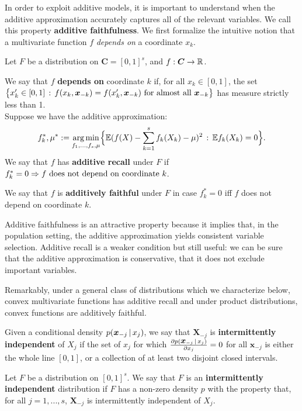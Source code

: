 In order to exploit additive models, it is important to understand when the
additive approximation accurately captures all of the relevant variables.
We call this property \textbf{additive faithfulness}. We first formalize the intuitive notion that a multivariate function $f$ \emph{depends on} a coordinate $x_k$.

\begin{definition}
  Let $F$ be a distribution on $\mathbf{C}=[0,1]^s$, and $f:\mbox{\boldmath $C$}\rightarrow {\mathbb R}$. 
  
We say that $f$ \textbf{depends on} coordinate $k$ if, for all $x_k \in [0,1]$, the set 
$\big\{ x'_k \in [0, 1] \,:\, f(x_k, \mbox{\boldmath $x$}_{-k}) = f(x'_k, \mbox{\boldmath $x$}_{-k}) 
\textrm{ for almost all  $\mbox{\boldmath $x$}_{-k}$} \big\}$ 
has measure strictly less than 1.\\

Suppose we have the additive approximation:
\begin{equation}
f_k^*, \mu^* := \mathop{\text{\rm arg\,min}}_{f_1,\ldots, f_s, \mu} \Bigl\{ 
             {\mathbb E} ( f(X) - \sum_{k=1}^s f_k(X_k) -\mu )^2 
         \,:\, {\mathbb E} f_k(X_k) = 0 \Bigr\}.
\end{equation}
We say that $f$ has \textbf{additive recall} under $F$ if $f^*_k = 0 \Rightarrow \textrm{$f$ does not depend on coordinate $k$}$. 

We say that $f$ is \textbf{additively faithful} under $F$ in case $f^*_k = 0$ iff $f$ does not depend on coordinate $k$. 
\end{definition}

Additive faithfulness is an attractive property because it implies that, in the population setting, the additive approximation yields consistent variable selection. Additive recall is a weaker condition but still useful: we can be sure that the additive approximation is conservative, that it does not exclude important variables.

Remarkably, under a general class of distributions which we characterize below, convex multivariate functions has additive recall and under product distributions, convex functions are additively faithful.

\begin{definition}
Given a conditional density $p(\mbox{\boldmath $x$}_{-j} {\,|\,} x_j)$, we say that $\mathbf{X}_{-j}$ is \textbf{intermittently independent} of $X_j$ if the set of $x_j$ for which $\frac{\partial p(\mbox{\boldmath $x$}_{-j} {\,|\,} x_j)}{\partial x_j} = 0$ for all $\mathbf{x}_{-j}$ is either the whole line $[0,1]$, or a collection of at least two disjoint closed intervals.

Let $F$ be a distribution on $[0,1]^s$. We say that $F$ is an \textbf{intermittently independent} distribution if $F$ has a non-zero density $p$ with the property that, for all $j=1,...,s$, $\mathbf{X}_{-j}$ is intermittently independent of $X_j$.
\end{definition}

